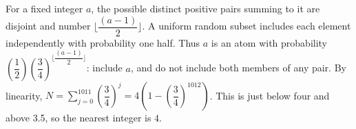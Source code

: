 For a fixed integer $a$, the possible distinct positive pairs summing to it are disjoint and number $\lfloor\dfrac{(a-1)}{2}\rfloor$. A uniform random subset includes each element independently with probability one half. Thus $a$ is an atom with probability $(\dfrac{1}{2})(\dfrac{3}{4})^{\lfloor\dfrac{(a-1)}{2}\rfloor}$: include $a$, and do not include both members of any pair. By linearity, $N=\sum_{j=0}^{1011}(\dfrac{3}{4})^j=4(1-(\dfrac{3}{4})^{1012})$. This is just below four and above 3.5, so the nearest integer is $\boxed4$.
